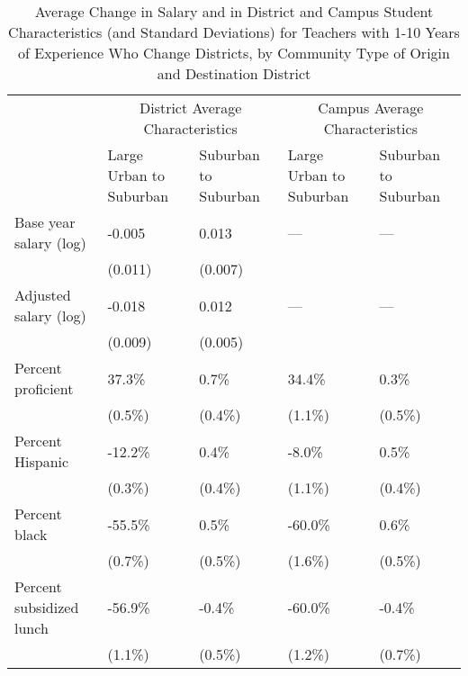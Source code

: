 \documentclass[]{article}
\begin{document}
\begin{table}[ht]
\centering
\begin{tabular}{lp{}p{}p{}p{}}
  \hline
 & \multicolumn{2}{c}{District Average Characteristics} & \multicolumn{2}{c}{Campus Average Characteristics}\\ \cline{2-5}
 & Large Urban to Suburban & Suburban to Suburban & Large Urban to Suburban & Suburban to Suburban \\
  \hline
Base year salary (log) & -0.005 & 0.013 & --- & --- \\ 
   & (0.011) & (0.007) &  &  \\ 
  Adjusted salary (log) & -0.018 & 0.012 & --- & --- \\ 
   & (0.009) & (0.005) &  &  \\ 
  Percent proficient & 37.3\% & 0.7\% & 34.4\% & 0.3\% \\ 
   & (0.5\%) & (0.4\%) & (1.1\%) & (0.5\%) \\ 
  Percent Hispanic & -12.2\% & 0.4\% & -8.0\% & 0.5\% \\ 
   & (0.3\%) & (0.4\%) & (1.1\%) & (0.4\%) \\ 
  Percent black & -55.5\% & 0.5\% & -60.0\% & 0.6\% \\ 
   & (0.7\%) & (0.5\%) & (1.6\%) & (0.5\%) \\ 
  Percent subsidized lunch & -56.9\% & -0.4\% & -60.0\% & -0.4\% \\ 
   & (1.1\%) & (0.5\%) & (1.2\%) & (0.7\%) \\ 
   \hline
\end{tabular}
\caption{Average Change in Salary and in District and Campus Student Characteristics (and Standard Deviations) for Teachers with 1-10 Years of Experience Who Change Districts, by Community Type of Origin and Destination District} 
\label{tbl:change_by_urb}
\end{table}
\end{document}
